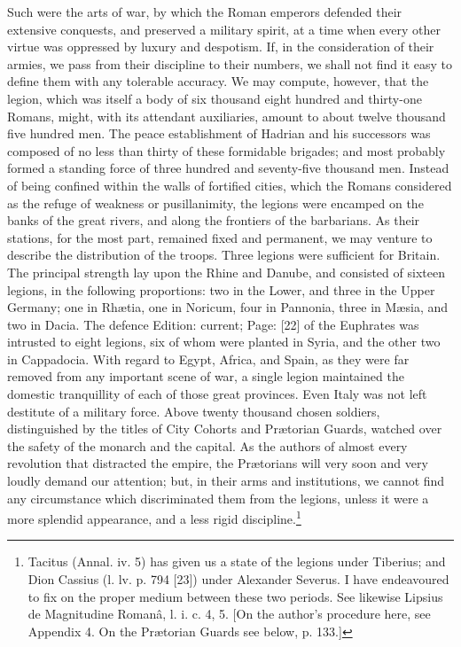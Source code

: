 Such were the arts of war, by which the Roman emperors defended their extensive conquests, and preserved a military spirit, at a time when every other virtue was oppressed by luxury and despotism. If, in the consideration of their armies, we pass from their discipline to their numbers, we shall not find it easy to define them with any tolerable accuracy. We may compute, however, that the legion, which was itself a body of six thousand eight hundred and thirty-one Romans, might, with its attendant auxiliaries, amount to about twelve thousand five hundred men. The peace establishment of Hadrian and his successors was composed of no less than thirty of these formidable brigades; and most probably formed a standing force of three hundred and seventy-five thousand men. Instead of being confined within the walls of fortified cities, which the Romans considered as the refuge of weakness or pusillanimity, the legions were encamped on the banks of the great rivers, and along the frontiers of the barbarians. As their stations, for the most part, remained fixed and permanent, we may venture to describe the distribution of the troops. Three legions were sufficient for Britain. The principal strength lay upon the Rhine and Danube, and consisted of sixteen legions, in the following proportions: two in the Lower, and three in the Upper Germany; one in Rhætia, one in Noricum, four in Pannonia, three in Mæsia, and two in Dacia. The defence Edition: current; Page: [22] of the Euphrates was intrusted to eight legions, six of whom were planted in Syria, and the other two in Cappadocia. With regard to Egypt, Africa, and Spain, as they were far removed from any important scene of war, a single legion maintained the domestic tranquillity of each of those great provinces. Even Italy was not left destitute of a military force. Above twenty thousand chosen soldiers, distinguished by the titles of City Cohorts and Prætorian Guards, watched over the safety of the monarch and the capital. As the authors of almost every revolution that distracted the empire, the Prætorians will very soon and very loudly demand our attention; but, in their arms and institutions, we cannot find any circumstance which discriminated them from the legions, unless it were a more splendid appearance, and a less rigid discipline.\footnote{Tacitus (Annal. iv. 5) has given us a state of the legions under Tiberius; and Dion Cassius (l. lv. p. 794 [23]) under Alexander Severus. I have endeavoured to fix on the proper medium between these two periods. See likewise Lipsius de Magnitudine Romanâ, l. i. c. 4, 5. [On the author\texthebrew{}’s procedure here, see Appendix 4. On the Prætorian Guards see below, p. 133.]}

